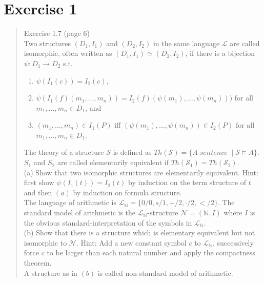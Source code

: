 \documentclass[11pt,a4paper]{article}
\begin{document}

\section*{Exercise 1}
\begin{quote}
Exercise 1.7 (page 6)\\
Two structures $(D_1, I_1)$ and $(D_2, I_2)$ in the same language $\mathcal{L}$ are called isomorphic, often written as $(D_1, I_1) \simeq (D_2, I_2)$, if there is a bijection $\psi: D_1 \to D_2$ s.t.
\begin{enumerate}
\item $\psi(I_1(c))=I_2(c)$,
\item $\psi(I_1(f)(m_1, \dots, m_n))=I_2(f)(\psi(m_1), \dots, \psi(m_n)))$ for all $m_1,\dots, m_n \in D_1$, and 
\item $(m_1, \dots, m_n) \in I_1(P)$ iff $(\psi(m_1), \dots, \psi(m_n)) \in I_2(P)$ for all $m_1,\dots, m_n \in D_1$.
\end{enumerate}
The theory of a structure $\mathcal{S}$ is defined as $Th(\mathcal{S})= \{ A \; \mathit{sentence} \; \mid \mathcal{S} \models A \}$. $S_1$ and $S_2$ are called
elementarily equivalent if $Th(\mathcal{S}_1)=Th(\mathcal{S}_2)$. \\

(a) Show that two isomorphic structures are elementarily equivalent.
Hint: first show $\psi(I_1(t))=I_2(t)$ by induction on the term structure of $t$ and then $(a)$ by
induction on formula structure.\\

The language of arithmetic is $\mathcal{L}_{\mathbb{N}}=\{0/0, s/1, +/2, \cdot/2, </2\}$. The standard model of arithmetic
is the $\mathcal{L}_{\mathbb{N}}$-structure $\mathcal{N}=(\mathbb{N},I)$ where $I$ is the obvious standard-interpretation of the symbols in $\mathcal{L}_{\mathbb{N}}$. \\

 (b) Show that there is a structure which is elementary equivalent but not isomorphic to $\mathcal{N}$.
Hint: Add a new constant symbol $c$ to $\mathcal{L}_{\mathbb{N}}$, successively force $c$ to be larger than each natural number and apply the compactness theorem. \\

A structure as in $(b)$ is called non-standard model of arithmetic.
\end{quote}
\end{document}

